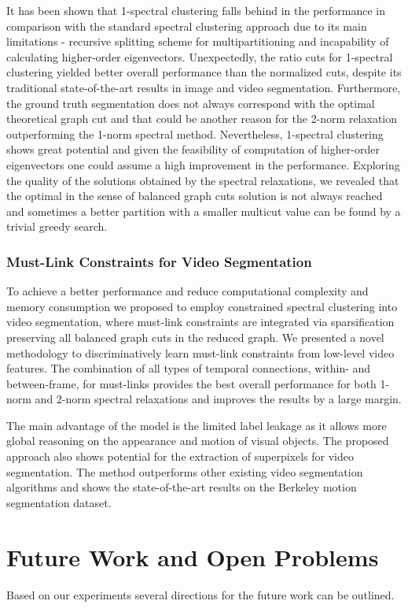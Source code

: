 It has been shown that 1-spectral clustering falls behind in the performance in comparison with the standard spectral clustering approach due to its main limitations - recursive splitting scheme for multipartitioning and incapability
of calculating higher-order eigenvectors. Unexpectedly, the ratio cuts for 1-spectral clustering yielded better overall performance than the normalized cuts, despite its traditional state-of-the-art results in image and video 
segmentation. Furthermore, the ground truth segmentation does not always correspond with the optimal theoretical graph cut and that could be another reason for the 2-norm relaxation outperforming the 1-norm spectral method.
Nevertheless, 1-spectral clustering shows great potential and given the feasibility of computation of higher-order eigenvectors one could assume a high improvement in the performance.
Exploring the quality of the solutions obtained by the spectral relaxations, we revealed that the optimal in the sense of balanced graph cuts solution is not always reached 
and sometimes a better partition with a smaller multicut value can be found by a trivial greedy search. 
%
\subsubsection*{Must-Link Constraints for Video Segmentation}
To achieve a better performance and reduce computational complexity and memory consumption we proposed to employ constrained spectral clustering into video segmentation, 
where must-link constraints are integrated via sparsification preserving all balanced graph cuts in the reduced graph. We presented a novel methodology to discriminatively learn must-link constraints from low-level video features.
The combination of all types of temporal connections, within- and between-frame, for must-links provides the best overall performance for both 1-norm and 2-norm spectral relaxations and improves the results by a large margin.

The main advantage of the model is the limited label leakage as it allows more global reasoning on the appearance and motion of visual objects. 
The proposed approach also shows potential for the extraction of superpixels for video segmentation.  
The method outperforms other existing video segmentation algorithms and shows the state-of-the-art results
on the Berkeley motion segmentation dataset.
\section{Future Work and Open Problems} 
Based on our experiments several directions for the future work can be outlined.
